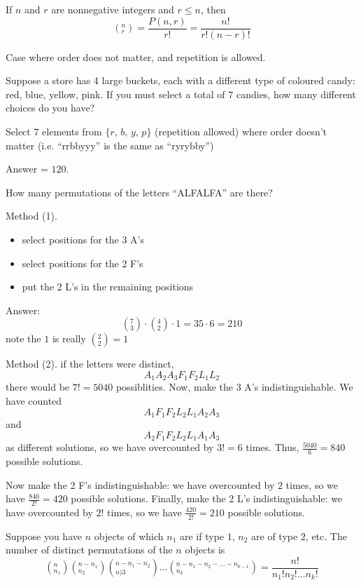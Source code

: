 \begin{theorm}
    If $n$ and $r$ are nonnegative integers and $r\leq n$, then $$\left(^n_r\right) = \frac{P(n,r)}{r!} = \frac{n!}{r!(n-r)!}$$
\end{theorm}

Case where order does not matter, and repetition is allowed.

\begin{example}
    Suppose a store has 4 large buckets, each with a different type of coloured candy: red, blue, yellow, pink. If you must select a total of $7$ candies, how many different choices do you have?

    Select $7$ elements from $\{r,\,b,\,y,\,p\}$ (repetition allowed) where order doesn't matter (i.e. ``rrbbyyy'' is the same as ``ryrybby'')

    Answer = $120$.
\end{example}

\begin{example}
    How many permutations of the letters ``ALFALFA'' are there?

    Method (1).
    \begin{itemize}
        \item select positions for the 3 A's
        \item select positions for the 2 F's
        \item put the 2 L's in the remaining positions
    \end{itemize}

    Answer: $$\left(^7_3\right) \cdot \left(^4_2\right) \cdot 1 = 35 \cdot 6 = 210$$ note the $1$ is really $\left(^2_2\right) = 1$


    Method (2). if the letters were distinct, $$A_1 A_2 A_3 F_1 F_2 L_1 L_2$$ there would be $7! = 5040$ possiblities. Now, make the 3 A's indistinguishable. We have counted $$A_1 F_1 F_2 L_2 L_1 A_2 A_3$$ and $$A_2 F_1 F_2 L_2 L_1 A_1 A_3$$ as different solutions, so we have overcounted by $3! = 6$ times. Thus, $\frac{5040}{6} = 840$ possible solutions.

    Now make the 2 F's indistinguishable: we have overcounted by $2$ times, so we have $\frac{840}{2!} = 420$ possible solutions. Finally, make the 2 L's indistinguishable: we have overcounted by $2!$ times, so we have $\frac{420}{2!} = 210$ possible solutions.
\end{example}

\begin{theorm}
    Suppose you have $n$ objects of which $n_1$ are if type $1$, $n_2$ are of type $2$, etc. The number of distinct permutations of the $n$ objects is $$\left(^n_{n_1}\right)\left(^{n-n_1}_{n_2}\right)\left(^{n-n_1-n_2}_{n)3}\right)\dots\left(^{n-n_1-n_2-\dots -n_{k-1}}_{n_k}\right) = \frac{n!}{n_1!n_2!\dots n_k!}$$
\end{theorm}

